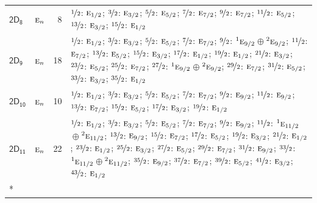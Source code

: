 \documentclass[10pt,a4paper]{article}
\numberwithin{equation}{section}
\newcommand{\grp}[1]{\mathsf{#1}}
\newcommand{\irr}[1]{\text{\normalfont\scshape #1}}
\newcommand{\conjpair}[1]{{}^{#1}}
\newlength{\fillwidth}\newlength{\cellwidth}\newlength{\colwidth}
\begin{document}
{\begin{longtable}{@{}llr>{\RaggedRight\arraybackslash}p{\fillwidth}@{}}
\href{2D8.pdf}{$\grp{2D_{8}}$} & $\irr{e}_{n}$ & 8 & $\nicefrac{1}{2}$: $\irr{e}_{1/2}$; $\nicefrac{3}{2}$: $\irr{e}_{3/2}$; $\nicefrac{5}{2}$: $\irr{e}_{5/2}$; $\nicefrac{7}{2}$: $\irr{e}_{7/2}$; $\nicefrac{9}{2}$: $\irr{e}_{7/2}$; $\nicefrac{11}{2}$: $\irr{e}_{5/2}$; $\nicefrac{13}{2}$: $\irr{e}_{3/2}$; $\nicefrac{15}{2}$: $\irr{e}_{1/2}$\\
\href{2D9.pdf}{$\grp{2D_{9}}$} & $\irr{e}_{n}$ & 18 & $\nicefrac{1}{2}$: $\irr{e}_{1/2}$; $\nicefrac{3}{2}$: $\irr{e}_{3/2}$; $\nicefrac{5}{2}$: $\irr{e}_{5/2}$; $\nicefrac{7}{2}$: $\irr{e}_{7/2}$; $\nicefrac{9}{2}$: $\conjpair{1}\irr{e}_{9/2}$${}\oplus{}$$\conjpair{2}\irr{e}_{9/2}$; $\nicefrac{11}{2}$: $\irr{e}_{7/2}$; $\nicefrac{13}{2}$: $\irr{e}_{5/2}$; $\nicefrac{15}{2}$: $\irr{e}_{3/2}$; $\nicefrac{17}{2}$: $\irr{e}_{1/2}$; $\nicefrac{19}{2}$: $\irr{e}_{1/2}$; $\nicefrac{21}{2}$: $\irr{e}_{3/2}$; $\nicefrac{23}{2}$: $\irr{e}_{5/2}$; $\nicefrac{25}{2}$: $\irr{e}_{7/2}$; $\nicefrac{27}{2}$: $\conjpair{1}\irr{e}_{9/2}$${}\oplus{}$$\conjpair{2}\irr{e}_{9/2}$; $\nicefrac{29}{2}$: $\irr{e}_{7/2}$; $\nicefrac{31}{2}$: $\irr{e}_{5/2}$; $\nicefrac{33}{2}$: $\irr{e}_{3/2}$; $\nicefrac{35}{2}$: $\irr{e}_{1/2}$\\
\href{2D10.pdf}{$\grp{2D_{10}}$} & $\irr{e}_{n}$ & 10 & $\nicefrac{1}{2}$: $\irr{e}_{1/2}$; $\nicefrac{3}{2}$: $\irr{e}_{3/2}$; $\nicefrac{5}{2}$: $\irr{e}_{5/2}$; $\nicefrac{7}{2}$: $\irr{e}_{7/2}$; $\nicefrac{9}{2}$: $\irr{e}_{9/2}$; $\nicefrac{11}{2}$: $\irr{e}_{9/2}$; $\nicefrac{13}{2}$: $\irr{e}_{7/2}$; $\nicefrac{15}{2}$: $\irr{e}_{5/2}$; $\nicefrac{17}{2}$: $\irr{e}_{3/2}$; $\nicefrac{19}{2}$: $\irr{e}_{1/2}$\\
\href{2D11.pdf}{$\grp{2D_{11}}$} & $\irr{e}_{n}$ & 22 & $\nicefrac{1}{2}$: $\irr{e}_{1/2}$; $\nicefrac{3}{2}$: $\irr{e}_{3/2}$; $\nicefrac{5}{2}$: $\irr{e}_{5/2}$; $\nicefrac{7}{2}$: $\irr{e}_{7/2}$; $\nicefrac{9}{2}$: $\irr{e}_{9/2}$; $\nicefrac{11}{2}$: $\conjpair{1}\irr{e}_{11/2}$${}\oplus{}$$\conjpair{2}\irr{e}_{11/2}$; $\nicefrac{13}{2}$: $\irr{e}_{9/2}$; $\nicefrac{15}{2}$: $\irr{e}_{7/2}$; $\nicefrac{17}{2}$: $\irr{e}_{5/2}$; $\nicefrac{19}{2}$: $\irr{e}_{3/2}$; $\nicefrac{21}{2}$: $\irr{e}_{1/2}$; $\nicefrac{23}{2}$: $\irr{e}_{1/2}$; $\nicefrac{25}{2}$: $\irr{e}_{3/2}$; $\nicefrac{27}{2}$: $\irr{e}_{5/2}$; $\nicefrac{29}{2}$: $\irr{e}_{7/2}$; $\nicefrac{31}{2}$: $\irr{e}_{9/2}$; $\nicefrac{33}{2}$: $\conjpair{1}\irr{e}_{11/2}$${}\oplus{}$$\conjpair{2}\irr{e}_{11/2}$; $\nicefrac{35}{2}$: $\irr{e}_{9/2}$; $\nicefrac{37}{2}$: $\irr{e}_{7/2}$; $\nicefrac{39}{2}$: $\irr{e}_{5/2}$; $\nicefrac{41}{2}$: $\irr{e}_{3/2}$; $\nicefrac{43}{2}$: $\irr{e}_{1/2}$\\*

\end{longtable}}
\end{document}
